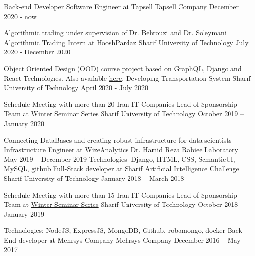 
\begin{cventries}
	\cventry
	{Back-end Developer}
	{Software Engineer at Tapsell}
	{Tapsell Company}
	{December 2020 - now}
	{}
	
  \cventry
  	{Algorithmic trading under supervision of \href{http://ee.sharif.edu/~behroozi}{Dr. Behrouzi} and \href{http://sharif.edu/~soleymani/}{Dr. Soleymani}}
  	{Algorithmic Trading Intern at HooshPardaz}
  	{Sharif University of Technology}
	{July 2020 - December 2020}
	{}
	
	\cventry
	{Object Oriented Design (OOD) course project based on GraphQL, Django and React Technologies. Also available \href{https://github.com/mostafaghadimi/OOD_Project}{here}.}
	{Developing Transportation System}
	{Sharif University of Technology}
	{April 2020 - July 2020}
	{}

  \cventry
	{Schedule Meeting with more than 20 Iran IT Companies}
	{Lead of Sponsorship Team at \href{https://wss.ce.sharif.edu/2019/staff/}{Winter Seminar Series}}
	{Sharif University of Technology}
	{October 2019 – January 2020}
	{}
	
  \cventry
	{Connecting DataBases and creating robust infrastructure for data scientists}
	{Infrastructure Engineer at \href{http://wizeanalytics.com/}{WizeAnalytics}}
	{\href{http://sharif.edu/~rabiee/}{Dr. Hamid Reza Rabiee} Laboratory}
	{May 2019 – December 2019}
	{}
  \cventry
    {Technologies: Django, HTML, CSS, SemanticUI, MySQL, github}
    {Full-Stack developer at \href{https://aichallenge.sharif.edu/}{Sharif Artificial Intelligence Challenge}}
    {Sharif University of Technology}
    {January 2018 – March 2018}
    {}
    
      \cventry
    {Schedule Meeting with more than 15 Iran IT Companies}
    {Lead of Sponsorship Team at \href{https://wss.ce.sharif.edu/2018/staff/}{Winter Seminar Series}}
    {Sharif University of Technology}
    {October 2018 – January 2019}
    {}
    
  \cventry
    {Technologies: NodeJS, ExpressJS, MongoDB, Github, robomongo, docker}
    {Back-End developer at Mehrsys Company}
    {Mehrsys Company}
    {December 2016 – May 2017}
    {}
    
  
\end{cventries}
